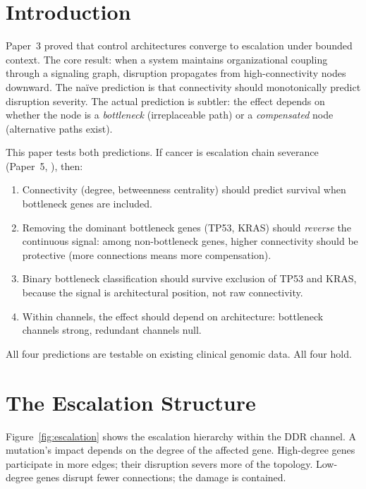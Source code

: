 \documentclass[11pt]{article}
\begin{document}
\section{Introduction}
\label{sec:intro}

Paper~3 \cite{McCarthy2026c} proved that control architectures
converge to escalation under bounded context. The core result:
when a system maintains organizational coupling through a
signaling graph, disruption propagates from high-connectivity
nodes downward. The na\"ive prediction is that connectivity should
monotonically predict disruption severity. The actual prediction
is subtler: the effect depends on whether the node is a
\emph{bottleneck} (irreplaceable path) or a \emph{compensated}
node (alternative paths exist).

This paper tests both predictions. If cancer is escalation chain
severance (Paper~5, \cite{McCarthy2026e}), then:

\begin{enumerate}
\item Connectivity (degree, betweenness centrality) should predict
survival when bottleneck genes are included.
\item Removing the dominant bottleneck genes (TP53, KRAS) should
\emph{reverse} the continuous signal: among non-bottleneck genes,
higher connectivity should be protective (more connections means
more compensation).
\item Binary bottleneck classification should survive exclusion
of TP53 and KRAS, because the signal is architectural position,
not raw connectivity.
\item Within channels, the effect should depend on architecture:
bottleneck channels strong, redundant channels null.
\end{enumerate}

All four predictions are testable on existing clinical genomic data.
All four hold.

\section{The Escalation Structure}
\label{sec:escalation}

Figure~\ref{fig:escalation} shows the escalation hierarchy within
the DDR channel. A mutation's impact depends on the degree of the
affected gene. High-degree genes participate in more edges; their
disruption severs more of the topology. Low-degree genes disrupt
fewer connections; the damage is contained.
\end{document}
